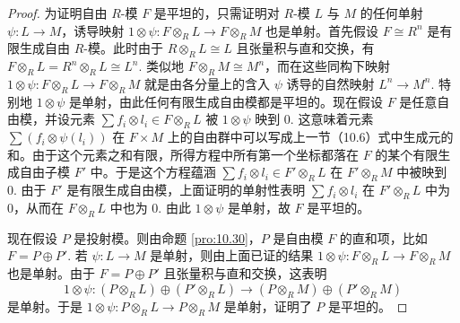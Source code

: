 \begin{proof}
为证明自由 \(R\)-模 \(F\) 是平坦的，只需证明对 \(R\)-模 \(L\) 与 \(M\) 的任何单射 \(\psi : L \to M\)，诱导映射 \(1 \otimes \psi : F \otimes_R L \to F \otimes_R M\) 也是单射。首先假设 \(F \cong R^n\) 是有限生成自由 \(R\)-模。此时由于 \(R \otimes_R L \cong L\) 且张量积与直和交换，有 \(F \otimes_R L = R^n \otimes_R L \cong L^n\). 类似地 \(F \otimes_R M \cong M^n\)，而在这些同构下映射 \(1 \otimes \psi : F \otimes_R L \to F \otimes_R M\) 就是由各分量上的含入 \(\psi\) 诱导的自然映射 \(L^n \to M^n\). 特别地 \(1 \otimes \psi\) 是单射，由此任何有限生成自由模都是平坦的。现在假设 \(F\) 是任意自由模，并设元素 \(\sum f_i \otimes l_i \in F \otimes_R L\) 被 \(1 \otimes \psi\) 映到 0. 这意味着元素 \(\sum(f_i \otimes \psi(l_i))\) 在 \(F \times M\) 上的自由群中可以写成上一节（10.6）式中生成元的和。由于这个元素之和有限，所得方程中所有第一个坐标都落在 \(F\) 的某个有限生成自由子模 \(F'\) 中。于是这个方程蕴涵 \(\sum f_i \otimes l_i \in F' \otimes_R L\) 在 \(F' \otimes_R M\) 中被映到 0. 由于 \(F'\) 是有限生成自由模，上面证明的单射性表明 \(\sum f_i \otimes l_i\) 在 \(F' \otimes_R L\) 中为 0，从而在 \(F \otimes_R L\) 中也为 0. 由此 \(1 \otimes \psi\) 是单射，故 \(F\) 是平坦的。

现在假设 \(P\) 是投射模。则由命题 \ref{pro:10.30}，\(P\) 是自由模 \(F\) 的直和项，比如 \(F = P \oplus P'\). 若 \(\psi : L \to M\) 是单射，则由上面已证的结果 \(1 \otimes \psi : F \otimes_R L \to F \otimes_R M\) 也是单射。由于 \(F = P \oplus P'\) 且张量积与直和交换，这表明
\[
1 \otimes \psi : (P \otimes_R L) \oplus (P' \otimes_R L) \to (P \otimes_R M) \oplus (P' \otimes_R M)
\]
是单射。于是 \(1 \otimes \psi : P \otimes_R L \to P \otimes_R M\) 是单射，证明了 \(P\) 是平坦的。
\end{proof}

